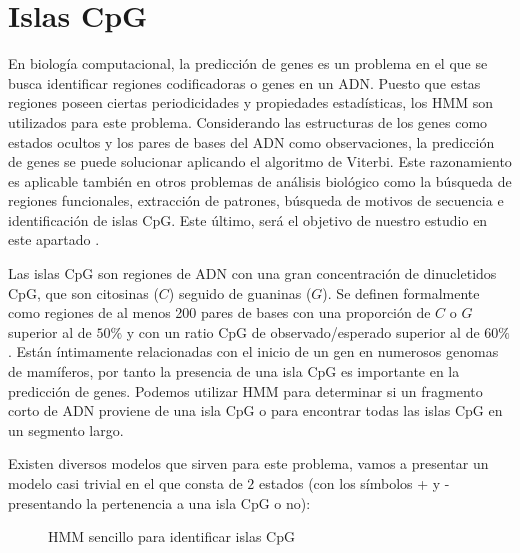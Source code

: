 \section{Islas CpG}
En biología computacional, la predicción de genes es un problema en el que se busca identificar regiones codificadoras o genes en un ADN. Puesto que estas regiones poseen ciertas periodicidades y propiedades estadísticas, los HMM son utilizados para este problema. Considerando las estructuras de los genes como estados ocultos y los pares de bases del ADN como observaciones, la predicción de genes se puede solucionar aplicando el algoritmo de Viterbi. Este razonamiento es aplicable también en otros problemas de análisis biológico como la búsqueda de regiones funcionales, extracción de patrones, búsqueda de motivos de secuencia e identificación de islas CpG. Este último, será el objetivo de nuestro estudio en este apartado \cite{bioStudies}.

Las islas CpG son regiones de ADN con una gran concentración de dinucletidos CpG, que son citosinas ($C$) seguido de guaninas ($G$). Se definen formalmente como regiones de al menos 200 pares de bases con una proporción de $C$ o $G$ superior al de $50\%$ y con un ratio CpG de observado/esperado superior al de $60\%$. Están íntimamente relacionadas con el inicio de un gen en numerosos genomas de mamíferos, por tanto la presencia de una isla CpG es importante en la predicción de genes. Podemos utilizar HMM para determinar si un fragmento corto de ADN proviene de una isla CpG o para encontrar todas las islas CpG en un segmento largo.

Existen diversos modelos que sirven para este problema, vamos a presentar un modelo casi trivial en el que consta de $2$ estados (con los símbolos + y - presentando la pertenencia a una isla CpG o no):

\begin{figure}[H]
\centering
{}
\caption{HMM sencillo para identificar islas CpG}
\end{figure}

